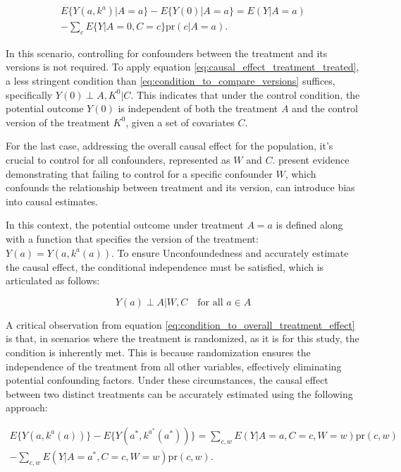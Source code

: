 \begin{equation}
  \begin{aligned}
    E\{Y(a, k^{a}) | A = a\} - E\{Y(0) | A = a\} = E(Y | A = a) \\
     - \sum_{c} E\{Y | A = 0, C = c\} \text{pr}(c | A = a).
  \end{aligned}
  \label{eq:causal_effect_treatment_treated}
\end{equation}

In this scenario, controlling for confounders between the treatment and its versions is not required. To apply equation \ref{eq:causal_effect_treatment_treated}, a less stringent
condition than \ref{eq:condition_to_compare_versions} suffices, specifically $Y(0) \perp {A,K^0} | C$. This indicates that under the control condition, 
the potential outcome $Y(0)$ is independent of both the treatment $A$ and the control version of the treatment $K^0$, given a set of covariates $C$.

For the last case, addressing the overall causal effect for the population, it's crucial to control for all confounders, represented as $W$ and $C$. 
\textcite{vanderweeleCausalInferenceMultiple2013} present evidence demonstrating that failing to control for a specific confounder $W$, which confounds 
the relationship between treatment and its version, can introduce bias into causal estimates.

In this context, the potential outcome under treatment $A=a$ is defined along with a function that specifies the version of the treatment: $Y(a) = Y(a, k^{a}(a))$.
To ensure Unconfoundedness and accurately estimate the causal effect, the conditional independence must be satisfied, which is articulated as follows:

\begin{equation}
  Y(a) \perp{{A}| {W,C}} \quad \text{for all } a \in A
  \label{eq:condition_to_overall_treatment_effect}
\end{equation}

A critical observation from equation \ref{eq:condition_to_overall_treatment_effect} is that, in scenarios where the treatment is randomized, as it is for
this study, the condition is inherently met. This is because randomization ensures the independence of the treatment from all other variables, effectively 
eliminating potential confounding factors. Under these circumstances, the causal effect between two distinct treatments can be accurately estimated using the following approach:

\begin{equation}
  \begin{aligned}
    E\{Y(a, k^{a}(a))\} - E\{Y(a^*, k^{a^*}(a^*))\} = \sum_{c,w} E(Y | A = a, C = c, W = w)\text{pr}(c, w) \\
     - \sum_{c,w} E(Y | A = a^*, C = c, W = w)\text{pr}(c, w).
  \end{aligned}
  \label{eq:causal_effect_overall_treatment}
\end{equation}

